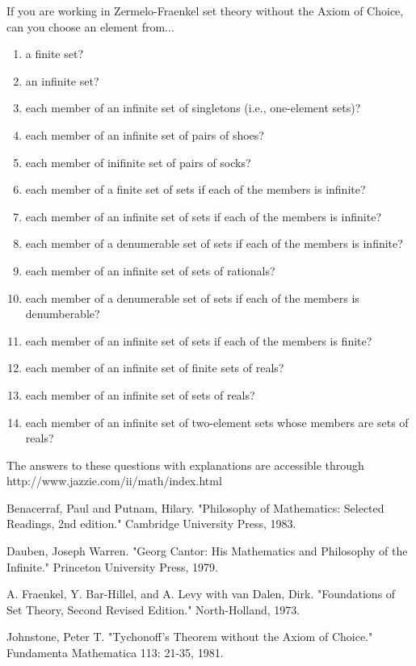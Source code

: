 \smallskip

If you are working in Zermelo-Fraenkel set theory without the Axiom of
Choice, can you choose an element from...
\begin{enumerate}
\item  a finite set?
 \item an infinite set?
 \item each member of an infinite set of singletons (i.e., one-element sets)?
 \item each member of an infinite set of pairs of shoes?
 \item each member of inifinite set of pairs of socks?
 \item each member of a finite set of sets if each of the members is infinite?
 \item each member of an infinite set of sets if each of the members is infinite?
 \item each member of a denumerable set of sets if each of the members is infinite?
 \item each member of an infinite set of sets of rationals?
\item each member of a denumerable set of sets if each of the members is
    denumberable?
\item each member of an infinite set of sets if each of the members is finite?
\item each member of an infinite set of finite sets of reals?
\item each member of an infinite set of sets of reals?
\item each member of an infinite set of two-element sets whose members are
    sets of reals?
\end{enumerate}
The answers to these questions with explanations are accessible through
http://www.jazzie.com/ii/math/index.html


\Ref

Benacerraf, Paul and Putnam, Hilary.  "Philosophy of Mathematics: Selected
Readings, 2nd edition." Cambridge University Press, 1983.

Dauben, Joseph Warren.  "Georg Cantor: His Mathematics and Philosophy of the
Infinite."  Princeton University Press, 1979.

A. Fraenkel, Y.  Bar-Hillel, and A. Levy with van Dalen, Dirk. "Foundations
of Set Theory, Second Revised Edition." North-Holland, 1973.

Johnstone, Peter T.  "Tychonoff's Theorem without the Axiom of Choice."
Fundamenta Mathematica 113: 21-35, 1981.

